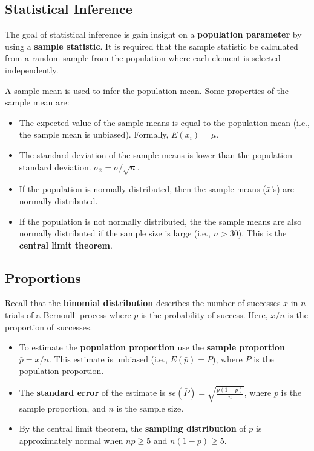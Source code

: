 \documentclass[
  letterpaper,
  DIV=11,
  numbers=noendperiod]{scrreprt}
\begin{document}
\hypertarget{statistical-inference-1}{%
\subsection*{Statistical Inference}\label{statistical-inference-1}}

The goal of statistical inference is gain insight on a
\textbf{population parameter} by using a \textbf{sample statistic}. It
is required that the sample statistic be calculated from a random sample
from the population where each element is selected independently.

A sample mean is used to infer the population mean. Some properties of
the sample mean are:

\begin{itemize}
\item
  The expected value of the sample means is equal to the population mean
  (i.e., the sample mean is unbiased). Formally, \(E(\bar x_i) = \mu\).
\item
  The standard deviation of the sample means is lower than the
  population standard deviation. \(\sigma_{\bar x}= \sigma/\sqrt{n}\).
\item
  If the population is normally distributed, then the sample means
  (\(\bar x\)'s) are normally distributed.
\item
  If the population is not normally distributed, the the sample means
  are also normally distributed if the sample size is large (i.e.,
  \(n>30\)). This is the \textbf{central limit theorem}.
\end{itemize}

\hypertarget{proportions}{%
\subsection*{Proportions}\label{proportions}}

Recall that the \textbf{binomial distribution} describes the number of
successes \(x\) in \(n\) trials of a Bernoulli process where \(p\) is
the probability of success. Here, \(x/n\) is the proportion of
successes.

\begin{itemize}
\item
  To estimate the \textbf{population proportion} use the \textbf{sample
  proportion} \(\bar p = x/n\). This estimate is unbiased (i.e.,
  \(E(\bar p)=P\)), where \(P\) is the population proportion.
\item
  The \textbf{standard error} of the estimate is
  \(se(\bar P)= \sqrt { \frac {p(1-p)}{n}}\), where \(p\) is the sample
  proportion, and \(n\) is the sample size.
\item
  By the central limit theorem, the \textbf{sampling distribution} of
  \(\bar p\) is approximately normal when \(np \geq 5\) and
  \(n(1-p)\geq 5\).
\end{itemize}
\end{document}
